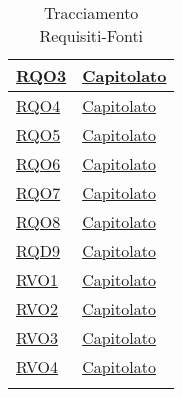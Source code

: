 \begin{longtable}{|>{\centering}m{5cm}|m{5cm}<{\centering}|}
 \hyperlink{RQO3}{RQO3} & \hyperlink{Capitolato}{Capitolato}\\
\hline

 \hyperlink{RQO4}{RQO4} & \hyperlink{Capitolato}{Capitolato}\\
\hline

 \hyperlink{RQO5}{RQO5} & \hyperlink{Capitolato}{Capitolato}\\
\hline

 \hyperlink{RQO6}{RQO6} & \hyperlink{Capitolato}{Capitolato}\\
\hline

 \hyperlink{RQO7}{RQO7} & \hyperlink{Capitolato}{Capitolato}\\
\hline

 \hyperlink{RQO8}{RQO8} & \hyperlink{Capitolato}{Capitolato}\\
\hline

 \hyperlink{RQD9}{RQD9} & \hyperlink{Capitolato}{Capitolato}\\
\hline

 \hyperlink{RVO1}{RVO1} & \hyperlink{Capitolato}{Capitolato}\\
\hline

 \hyperlink{RVO2}{RVO2} & \hyperlink{Capitolato}{Capitolato}\\
\hline

 \hyperlink{RVO3}{RVO3} & \hyperlink{Capitolato}{Capitolato}\\
\hline

 \hyperlink{RVO4}{RVO4} & \hyperlink{Capitolato}{Capitolato}\\
\hline

\caption[Tracciamento Requisiti-Fonti]{Tracciamento Requisiti-Fonti}
\label{tabella:requi-fonti}
\end{longtable}
\clearpage
